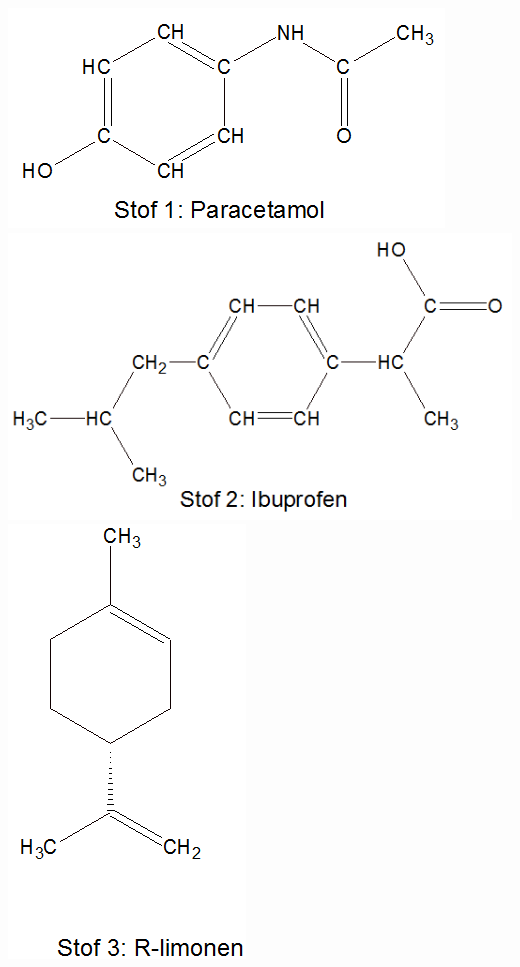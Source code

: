 \includegraphics[scale=0.5]{Billeder/paracetamol}
\includegraphics[scale=0.5]{Billeder/ibuprofen}
\includegraphics[scale=0.5]{Billeder/Rlimonen}
